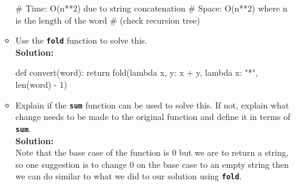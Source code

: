 \begin{enumerate}[(a)]
\begin{itemize}
\begin{python}
# Time: O(n**2) due to string concatenation
# Space: O(n**2) where n is the length of the word
# (check recursion tree)
\end{python}
\item Use the \texttt{\bfseries fold} function to solve this. \\
\textbf{Solution:}
\begin{python}
def convert(word):
    return fold(lambda x, y: x + y, lambda x: "*", len(word) - 1)
\end{python}
\item Explain if the \texttt{\bfseries sum} function can be used to solve this. If not, explain what change needs
to be made to the original function and define it in terms of \texttt{\bfseries sum}. \\
\textbf{Solution:} \\
Note that the base case of the function is 0 but we are to return a string, so one suggestion is to change 0 on the 
base case to an empty string then we can do similar to what we did to our solution using \texttt{\bfseries fold}.
\end{itemize}


\end{enumerate}
